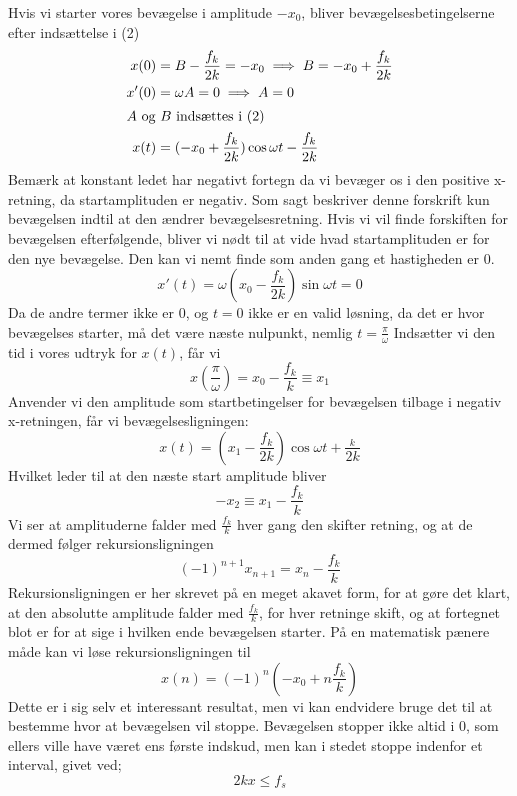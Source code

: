 Hvis vi starter vores bevægelse i amplitude $-x_0$, bliver bevægelsesbetingelserne efter indsættelse i (2)
\begin{align*}
    x(0) &= B - \frac{f_k}{2k} = -x_0 \implies B = -x_0 + \frac{f_k}{2k} \\
    x'(0) &= \omega A = 0 \implies A = 0 \\
    \shortintertext{$A$ og $B$ indsættes i (2)}
    x(t) &= (-x_0 + \frac{f_k}{2k})\cos \omega t - \frac{f_k}{2k}
\end{align*}
Bemærk at konstant ledet har negativt fortegn da vi bevæger os i den positive x-retning, da startamplituden er negativ.
Som sagt beskriver denne forskrift kun bevægelsen indtil at den ændrer bevægelsesretning. 
Hvis vi vil finde forskiften for bevægelsen efterfølgende, bliver vi nødt til at vide hvad startamplituden er for den nye bevægelse.
Den kan vi nemt finde som anden gang et hastigheden er 0.
\[
x'(t) = \omega(x_0 - \frac{f_k}{2k})\sin \omega t = 0
\]
Da de andre termer ikke er 0, og $t = 0$ ikke er en valid løsning, da det er hvor bevægelses starter, må det være næste nulpunkt, nemlig $t = \frac{\pi}{\omega}$
Indsætter vi den tid i vores udtryk for $x(t)$, får vi 
\[
x(\frac{\pi}{\omega}) = x_0 - \frac{f_k}{k} \equiv x_1
\]
Anvender vi den amplitude som startbetingelser for bevægelsen tilbage i negativ x-retningen, får vi bevægelsesligningen:
\[
x(t) = (x_1 - \frac{f_k}{2k})\cos \omega t + \frac{_k}{2k}
\]
Hvilket leder til at den næste start amplitude bliver 
\[
-x_2 \equiv x_1 - \frac{f_k}{k}
\]
Vi ser at amplituderne falder med $\frac{f_k}{k}$ hver gang den skifter retning, og at de dermed følger rekursionsligningen
\begin{equation}
    (-1)^{n+1} x_{n+1} = x_n - \frac{f_k}{k}
\end{equation}
Rekursionsligningen er her skrevet på en meget akavet form, for at gøre det klart, at den absolutte amplitude falder med $\frac{f_k}{k}$, for hver retninge skift, 
og at fortegnet blot er for at sige i hvilken ende bevægelsen starter. På en matematisk pænere måde kan vi løse rekursionsligningen til
\begin{equation}
    x(n) = (-1)^n (-x_0 + n \frac{f_k}{k})
\end{equation}
Dette er i sig selv et interessant resultat, men vi kan endvidere bruge det til at bestemme hvor at bevægelsen vil stoppe. 
Bevægelsen stopper ikke altid i 0, som ellers ville have været ens første indskud, men kan i stedet stoppe indenfor et interval, givet ved;
\begin{equation*}
    2kx \leq f_s
\end{equation*}

